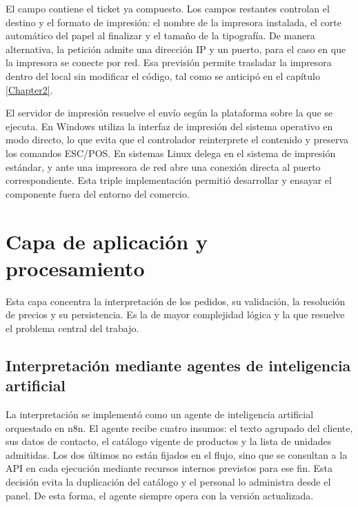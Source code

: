 El campo  contiene el ticket ya compuesto. Los campos restantes controlan el destino y el formato de impresión: el nombre de la impresora instalada, el corte automático del papel al finalizar y el tamaño de la tipografía. De manera alternativa, la petición admite una dirección IP y un puerto, para el caso en que la impresora se conecte por red. Esa previsión permite trasladar la impresora dentro del local sin modificar el código, tal como se anticipó en el capítulo \ref{Chapter2}.

El servidor de impresión resuelve el envío según la plataforma sobre la que se ejecuta. En Windows utiliza la interfaz de impresión del sistema operativo en modo directo, lo que evita que el controlador reinterprete el contenido y preserva los comandos ESC/POS. En sistemas Linux delega en el sistema de impresión estándar, y ante una impresora de red abre una conexión directa al puerto correspondiente. Esta triple implementación permitió desarrollar y ensayar el componente fuera del entorno del comercio.


\section{Capa de aplicación y procesamiento}
\label{sec:capa_aplicacion}

Esta capa concentra la interpretación de los pedidos, su validación, la resolución de precios y su persistencia. Es la de mayor complejidad lógica y la que resuelve el problema central del trabajo.

\subsection{Interpretación mediante agentes de inteligencia artificial}
\label{subsec:interpretacion_ia}

La interpretación se implementó como un agente de inteligencia artificial orquestado en n8n. El agente recibe cuatro insumos: el texto agrupado del cliente, sus datos de contacto, el catálogo vigente de productos y la lista de unidades admitidas. Los dos últimos no están fijados en el flujo, sino que se consultan a la API en cada ejecución mediante recursos internos previstos para ese fin. Esta decisión evita la duplicación del catálogo y el personal lo administra desde el panel. De esta forma, el agente siempre opera con la versión actualizada.

